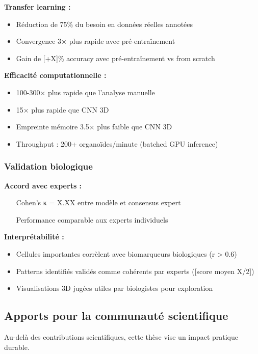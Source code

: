 \textbf{Transfer learning :}
\begin{itemize}
    \item Réduction de 75\% du besoin en données réelles annotées
    \item Convergence 3× plus rapide avec pré-entraînement
    \item Gain de [+X]\% accuracy avec pré-entraînement vs from scratch
\end{itemize}

\textbf{Efficacité computationnelle :}
\begin{itemize}
    \item 100-300× plus rapide que l'analyse manuelle
    \item 15× plus rapide que CNN 3D
    \item Empreinte mémoire 3.5× plus faible que CNN 3D
    \item Throughput : 200+ organoïdes/minute (batched GPU inference)
\end{itemize}

\subsubsection{Validation biologique}

\textbf{Accord avec experts :}
\begin{itemize}
    \item [Cohen's κ = X.XX entre modèle et consensus expert]
    \item [Performance comparable aux experts individuels]
\end{itemize}

\textbf{Interprétabilité :}
\begin{itemize}
    \item Cellules importantes corrèlent avec biomarqueurs biologiques (r > 0.6)
    \item Patterns identifiés validés comme cohérents par experts ([score moyen X/2])
    \item Visualisations 3D jugées utiles par biologistes pour exploration
\end{itemize}

\subsection{Apports pour la communauté scientifique}

Au-delà des contributions scientifiques, cette thèse vise un impact pratique durable.


